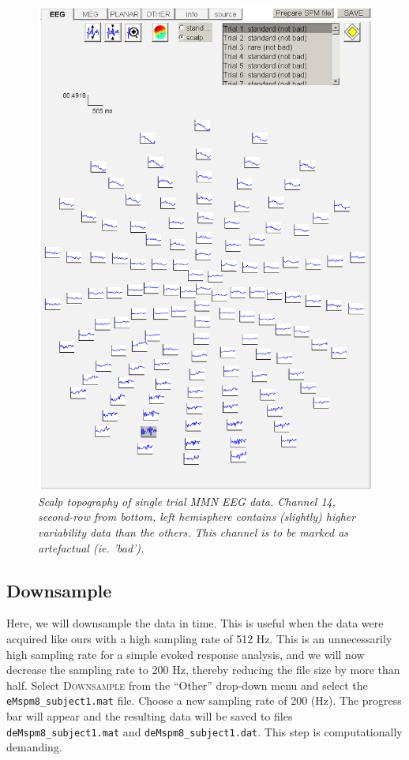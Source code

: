 \begin{figure}
\begin{center}
\includegraphics[width=120mm]{mmn/topo1}
\caption{\em Scalp topography of single trial MMN EEG data. Channel 14, second-row from bottom, left hemisphere contains (slightly) higher variability data than the others. This channel is to be marked as artefactual (ie. 'bad').
\label{topo1}}
\end{center}
\end{figure}

\subsection{Downsample}
Here, we will downsample the data in time. This is useful when the data were acquired like ours with a high sampling rate of 512 Hz. This is an unnecessarily high sampling rate for a simple evoked response analysis, and we will now decrease the sampling rate to 200 Hz, thereby reducing the file size by more than half. Select \textsc{Downsample} from the ``Other'' drop-down menu and select the \texttt{eMspm8\_subject1.mat} file. Choose a new sampling rate of 200 (Hz). The progress bar will appear and the resulting data will be saved to files \texttt{deMspm8\_subject1.mat} and \texttt{deMspm8\_subject1.dat}. This step is computationally demanding.

